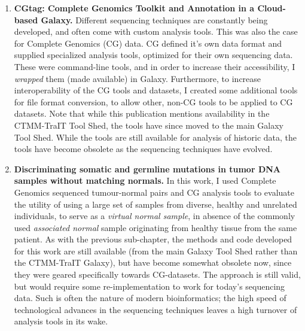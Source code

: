 \begin{enumerate}[label=\ref{chapter:virtualnormal}.\arabic*]
\itemsep-0.5em
\setcounter{enumi}{-1}
\item \textbf{CGtag: Complete Genomics Toolkit and Annotation in a Cloud-based Galaxy.}
Different sequencing techniques are constantly being developed, and often come with custom analysis tools. This was also the case for Complete Genomics (CG) data. CG defined it's own data format and supplied specialized analysis tools, optimized for their own sequencing data. These were command-line tools, and in order to increase their accessibility, I \emph{wrapped} them (made available) in Galaxy. Furthermore, to increase interoperability of the CG tools and datasets, I created some additional tools for file format conversion, to allow other, non-CG tools to be applied to CG datasets. Note that while this publication mentions availability in the CTMM-TraIT Tool Shed, the tools have since moved to the main Galaxy Tool Shed. While the tools are still available for analysis of historic data, the tools have become obsolete as the sequencing techniques have evolved.

\item \textbf{Discriminating somatic and germline mutations in tumor DNA samples without matching normals.} In this work, I used Complete Genomics sequenced tumour-normal pairs and CG analysis tools to evaluate the utility of using a large set of samples from diverse, healthy and unrelated individuals, to serve as a \emph{virtual normal sample}, in absence of the commonly used \emph{associated normal} sample originating from healthy tissue from the same patient. As with the previous sub-chapter, the methods and code developed for this work are still available (from the main Galaxy Tool Shed rather than the CTMM-TraIT Galaxy), but have become somewhat obsolete now, since they were geared specifically towards CG-datasets. The approach is still valid, but would require some re-implementation to work for today's sequencing data. Such is often the nature of modern bioinformatics; the high speed of technological advances in the sequencing techniques leaves a high turnover of analysis tools in its wake.


\end{enumerate}
